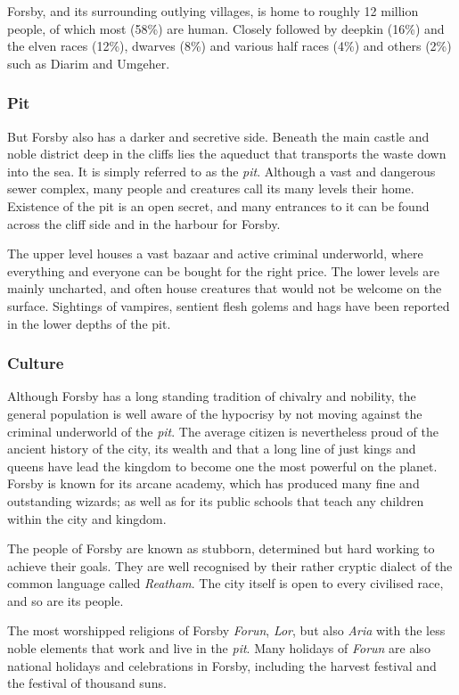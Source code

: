 Forsby, and its surrounding outlying villages, is home to roughly 12 million
people, of which most (58\%) are human. Closely followed by deepkin (16\%)
and the elven races (12\%), dwarves (8\%) and various half races (4\%) and
others (2\%) such as Diarim and Umgeher.

\subsubsection{Pit}
\label{sec:Pit}

But Forsby also has a darker and secretive side. Beneath the main
castle and noble district deep in the cliffs lies the aqueduct that transports
the waste down into the sea. It is simply referred to as the \emph{pit}.
Although a vast and dangerous sewer complex, many people and creatures call
its many levels their home. Existence of the pit is an open secret, and many
entrances to it can be found across the cliff side and in the harbour for
Forsby.

The upper level houses a vast bazaar and active criminal underworld, where
everything and everyone can be bought for the right price. The lower levels
are mainly uncharted, and often house creatures that would not be welcome on
the surface. Sightings of vampires, sentient flesh golems and hags have been
reported in the lower depths of the pit.

\subsubsection{Culture}

Although Forsby has a long standing tradition of chivalry and nobility,
the general population is well aware of the hypocrisy by not moving against the
criminal underworld of the \emph{pit}. The average citizen is nevertheless
proud of the ancient history of the city, its wealth and that a long line of
just kings and queens have lead the kingdom to become one the most powerful on
the planet. Forsby is known for its arcane academy, which has produced
many fine and outstanding wizards; as well as for its public schools that
teach any children within the city and kingdom.

The people of Forsby are known as stubborn, determined but hard working
to achieve their goals. They are well recognised by their rather cryptic dialect
of the common language called \emph{Reatham}. The city itself is open to every
civilised race, and so are its people.

The most worshipped religions of Forsby \emph{Forun}, \emph{Lor}, but
also \emph{Aria} with the less noble elements that work and live in the
\emph{pit}. Many holidays of \emph{Forun} are also national holidays and
celebrations in Forsby, including the harvest festival and the festival of
thousand suns.

